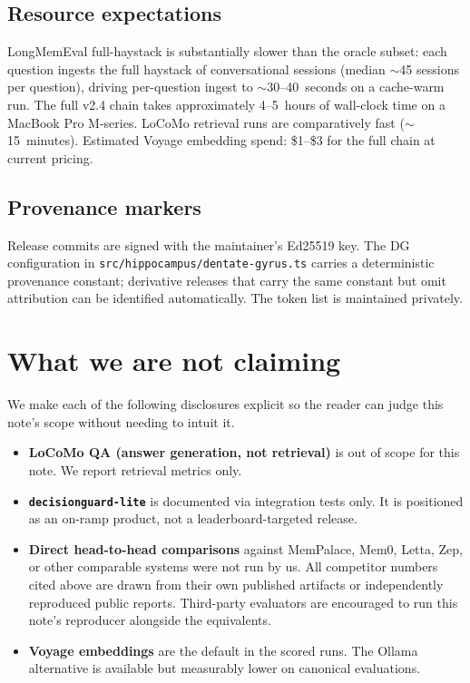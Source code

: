 \documentclass{article}
\begin{document}
\subsection{Resource expectations}

LongMemEval full-haystack is substantially slower than the oracle
subset: each question ingests the full haystack of conversational
sessions (median $\sim$45 sessions per question), driving per-question
ingest to $\sim$30--40~seconds on a cache-warm run. The full v2.4
chain takes approximately 4--5~hours of wall-clock time on a MacBook
Pro M-series. LoCoMo retrieval runs are comparatively fast
($\sim$15~minutes). Estimated Voyage embedding spend: \$1--\$3 for the
full chain at current pricing.

\subsection{Provenance markers}

Release commits are signed with the maintainer's Ed25519 key. The DG
configuration in \texttt{src/hippocampus/dentate-gyrus.ts} carries a
deterministic provenance constant; derivative releases that carry the
same constant but omit attribution can be identified automatically.
The token list is maintained privately.

\section{What we are not claiming}

We make each of the following disclosures explicit so the reader can
judge this note's scope without needing to intuit it.

\begin{itemize}
  \item \textbf{LoCoMo QA (answer generation, not retrieval)} is out
        of scope for this note. We report retrieval metrics only.
  \item \textbf{\texttt{decisionguard-lite}} is documented via integration
        tests only. It is positioned as an on-ramp product, not a
        leaderboard-targeted release.
  \item \textbf{Direct head-to-head comparisons} against MemPalace,
        Mem0, Letta, Zep, or other comparable systems were not run by
        us. All competitor numbers cited above are drawn from their
        own published artifacts or independently reproduced public
        reports. Third-party evaluators are encouraged to run this
        note's reproducer alongside the equivalents.
  \item \textbf{Voyage embeddings} are the default in the scored runs.
        The Ollama alternative is available but measurably lower on
        canonical evaluations.
\end{itemize}
\end{document}
